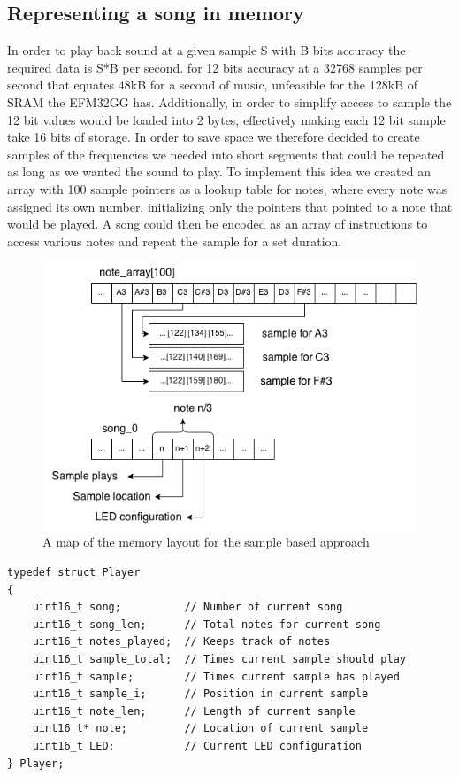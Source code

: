 \subsection{Representing a song in memory}
In order to play back sound at a given sample S with B bits accuracy the required data is S*B per second. for 12 bits accuracy at a 32768 samples per second that equates 48kB for a second of music, unfeasible for the 128kB of SRAM the EFM32GG has. Additionally, in order to simplify access to sample the 12 bit values would be loaded into 2 bytes, effectively making each 12 bit sample take 16 bits of storage. In order to save space we therefore decided to create samples of the frequencies we needed into short segments that could be repeated as long as we wanted the sound to play. To implement this idea we created an array with 100 sample pointers as a lookup table for notes, where every note was assigned its own number, initializing only the pointers that pointed to a note that would be played. A song could then be encoded as an array of instructions to access various notes and repeat the sample for a set duration.


\begin{figure}[ht]
  \centering
  \includegraphics[width=\textwidth]{images/sample_array_layout.png}
  \caption{A map of the memory layout for the sample based approach}\label{fig:array_layout}
\end{figure}

\begin{minipage}{\textwidth}
\begin{lstlisting}
typedef struct Player
{
	uint16_t song;			// Number of current song
	uint16_t song_len;		// Total notes for current song
	uint16_t notes_played;	// Keeps track of notes
	uint16_t sample_total;	// Times current sample should play	
	uint16_t sample;		// Times current sample has played
	uint16_t sample_i;		// Position in current sample 
	uint16_t note_len;		// Length of current sample
	uint16_t* note;			// Location of current sample
	uint16_t LED;			// Current LED configuration
} Player;
\end{lstlisting}
\end{minipage}

